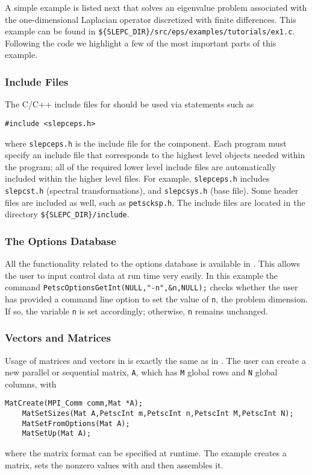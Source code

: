	A simple example is listed next that solves an eigenvalue problem associated with the one-dimensional Laplacian operator discretized with finite differences. This example can be found in \Verb!${SLEPC_DIR}/src/eps/examples/tutorials/ex1.c!. Following the code we highlight a few of the most important parts of this example.  


\subsubsection*{Include Files}

The C/C++ include files for \slepc should be used via statements such as
	\begin{Verbatim}[fontsize=\small]
	#include <slepceps.h>
	\end{Verbatim}
where \Verb!slepceps.h! is the include file for the  component. Each \slepc program must specify an include file that corresponds to the highest level \slepc objects needed within the program; all of the required lower level include files are automatically included within the higher level files. For example, \Verb!slepceps.h! includes \Verb!slepcst.h! (spectral transformations), and \Verb!slepcsys.h! (base \slepc file). Some \petsc header files are included as well, such as \Verb!petscksp.h!. The \slepc include files are located in the directory \Verb!${SLEPC_DIR}/include!.

\subsubsection*{The Options Database}

All the \petsc functionality related to the options database is available in \slepc. This allows the user to input control data at run time very easily. In this example the command \Verb!PetscOptionsGetInt(NULL,"-n",&n,NULL);! checks whether the user has provided a command line option to set the value of \Verb!n!, the problem dimension.  If so, the variable \Verb!n! is set accordingly; otherwise, \Verb!n! remains unchanged.

\subsubsection*{Vectors and Matrices}

Usage of matrices and vectors in \slepc is exactly the same as in \petsc. The user can create a new parallel or sequential matrix, \texttt{A}, which has \texttt{M} global rows and \texttt{N} global columns, with 
	\begin{Verbatim}[fontsize=\small]
	MatCreate(MPI_Comm comm,Mat *A);
	MatSetSizes(Mat A,PetscInt m,PetscInt n,PetscInt M,PetscInt N);
	MatSetFromOptions(Mat A);
	MatSetUp(Mat A);
	\end{Verbatim}
where the matrix format can be specified at runtime. The example creates a matrix, sets the nonzero values with  and then assembles it.

